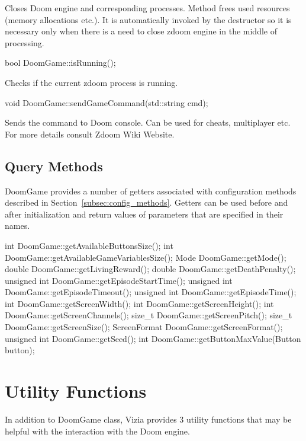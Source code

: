 	Closes Doom engine and corresponding processes. Method frees used resources (memory allocations etc.). It is automatically invoked by the destructor so it is necessary only when there is a need to close zdoom engine in the middle of processing.


\vspace{20pt}
\begin{clinee}
	bool DoomGame::isRunning();
\end{clinee}
	
	Checks if the current zdoom process is running.


\vspace{20pt}
\begin{clinee}
	void DoomGame::sendGameCommand(std::string cmd);
\end{clinee}

	Sends the command to Doom console. Can be used for cheats, multiplayer etc. For more details consult Zdoom Wiki Website\cite{zdoom-wiki}.


\vspace{20pt}
\subsection{Query Methods}

	DoomGame provides a number of getters associated with configuration methods described in Section~\ref{subsec:config_methods}. Getters can be used before and after initialization and return values of parameters that are specified in their names.


\vspace{20pt}
\begin{clinee}
int DoomGame::getAvailableButtonsSize();
int DoomGame::getAvailableGameVariablesSize();
Mode DoomGame::getMode();
double DoomGame::getLivingReward();
double DoomGame::getDeathPenalty();
unsigned int DoomGame::getEpisodeStartTime();
unsigned int DoomGame::getEpisodeTimeout();
unsigned int DoomGame::getEpisodeTime();
int DoomGame::getScreenWidth();
int DoomGame::getScreenHeight();
int DoomGame::getScreenChannels();
size_t DoomGame::getScreenPitch();
size_t DoomGame::getScreenSize();
ScreenFormat DoomGame::getScreenFormat();
unsigned int DoomGame::getSeed();
int DoomGame::getButtonMaxValue(Button button);
\end{clinee}


\section {Utility Functions}
	In addition to DoomGame class, Vizia provides 3 utility functions that may be helpful with the interaction with the Doom engine.

